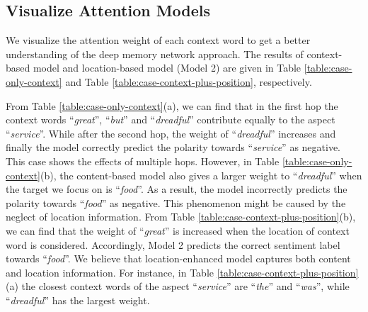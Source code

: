 \documentclass[11pt,letterpaper]{article}
\begin{document}
\subsection{Visualize Attention Models}
We visualize the attention weight of each context word to get a better understanding of the deep memory network approach.
The results of context-based model and location-based model (Model 2) are given in Table \ref{table:case-only-context} and Table \ref{table:case-context-plus-position}, respectively.

From Table \ref{table:case-only-context}(a), we can find that in the first hop the context words ``\textit{great}'', ``\textit{but}'' and ``\textit{dreadful}'' contribute equally to the aspect ``\textit{service}''. 
While after the second hop, the weight of ``\textit{dreadful}'' increases and finally the model correctly predict the polarity towards ``\textit{service}'' as negative. 
This case shows the effects of multiple hops.
However, in Table \ref{table:case-only-context}(b), the content-based model also gives a larger weight to ``\textit{dreadful}'' when the target we focus on is ``\textit{food}''. 
As a result, the model incorrectly predicts the polarity towards ``\textit{food}'' as negative.
This phenomenon might be caused by the neglect of location information. 
From Table \ref{table:case-context-plus-position}(b), we can find that the weight of ``\textit{great}'' is increased when the location of context word is considered. 
Accordingly, Model 2 predicts the correct sentiment label towards ``\textit{food}''.
We believe that location-enhanced model captures both content and location information. 
For instance, in Table \ref{table:case-context-plus-position}(a) the closest context words of the aspect ``\textit{service}'' are ``\textit{the}'' and ``\textit{was}'', while ``\textit{dreadful}'' has the largest weight.
\end{document}
